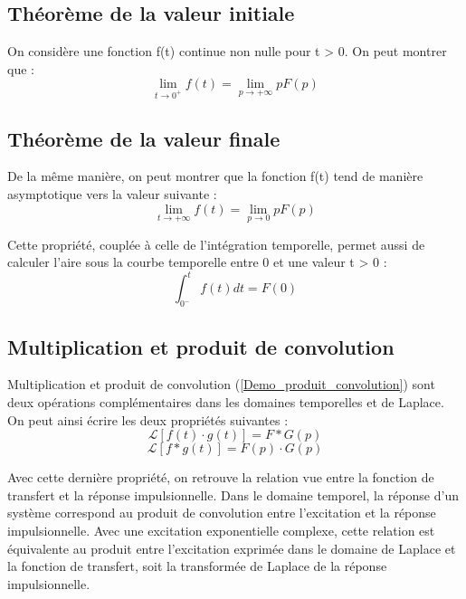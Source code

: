 	\subsection{Théorème de la valeur initiale}
	
	On considère une fonction f(t) continue non nulle pour t > 0. On peut montrer que :
	\begin{equation}\label{key}
		\lim_{t \to 0^{+}}f(t) = \lim_{p \to +\infty}pF(p)
	\end{equation}
	
	
	\subsection{Théorème de la valeur finale}
	De la même manière, on peut montrer que la fonction f(t) tend de manière asymptotique vers la valeur suivante :
	\begin{equation}\label{key}
		\lim_{t \to +\infty}f(t) = \lim_{p \to 0}pF(p)
	\end{equation}
	
	Cette propriété, couplée à celle de l'intégration temporelle, permet aussi de calculer l'aire sous la courbe temporelle entre 0 et une valeur t > 0 :
	\begin{equation}\label{key}
		\int_{0^{-}}^{t}f(t)dt=F(0)
	\end{equation}
	
	\subsection{Multiplication et produit de convolution}
	Multiplication et produit de convolution (\ref{Demo_produit_convolution}) sont deux opérations complémentaires dans les domaines temporelles et de Laplace. On peut ainsi écrire les deux propriétés suivantes :
	\begin{equation}\label{key}
		\mathcal{L}[f(t)\cdot g(t)] = F*G(p)
	\end{equation}
	\begin{equation}\label{key}
	\mathcal{L}[f*g(t)] = F(p) \cdot G(p)
	\end{equation}
	
	Avec cette dernière propriété, on retrouve la relation vue entre la fonction de transfert et la réponse impulsionnelle. Dans le domaine temporel, la réponse d'un système correspond au produit de convolution entre l'excitation et la réponse impulsionnelle. Avec une excitation exponentielle complexe, cette relation est équivalente au produit entre l'excitation exprimée dans le domaine de Laplace et la fonction de transfert, soit la transformée de Laplace de la réponse impulsionnelle.
	

